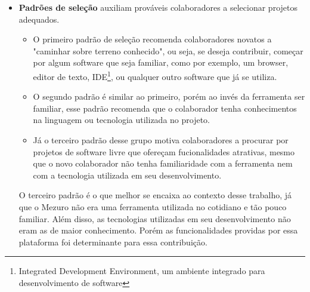 \begin{itemize}
\item \textbf{Padrões de seleção} auxiliam prováveis colaboradores a selecionar projetos adequados.
	\begin{itemize}
\item O primeiro padrão de seleção recomenda colaboradores novatos a "caminhar sobre terreno conhecido", ou seja, se deseja contribuir,  começar por algum software que seja familiar, como por exemplo, um browser, editor de texto, IDE\footnote{Integrated Development Environment, um ambiente integrado para desenvolvimento de software}, ou qualquer outro software que já se utiliza.
\item O segundo padrão é similar ao primeiro, porém ao invés da ferramenta ser familiar, esse padrão recomenda que o colaborador tenha conhecimentos na linguagem ou tecnologia utilizada no projeto.
\item Já o terceiro padrão desse grupo motiva colaboradores a procurar por projetos de software livre que ofereçam fucionalidades atrativas, mesmo que o novo colaborador não tenha familiaridade com a ferramenta nem com a tecnologia utilizada em seu desenvolvimento.
\end{itemize}

O terceiro padrão é o que melhor se encaixa ao contexto desse trabalho, já que o Mezuro não era uma ferramenta utilizada no cotidiano e tão pouco familiar. Além disso, as tecnologias utilizadas em seu desenvolvimento não eram as de maior conhecimento. Porém as funcionalidades providas por essa plataforma foi determinante para essa contribuição.


\end{itemize}

